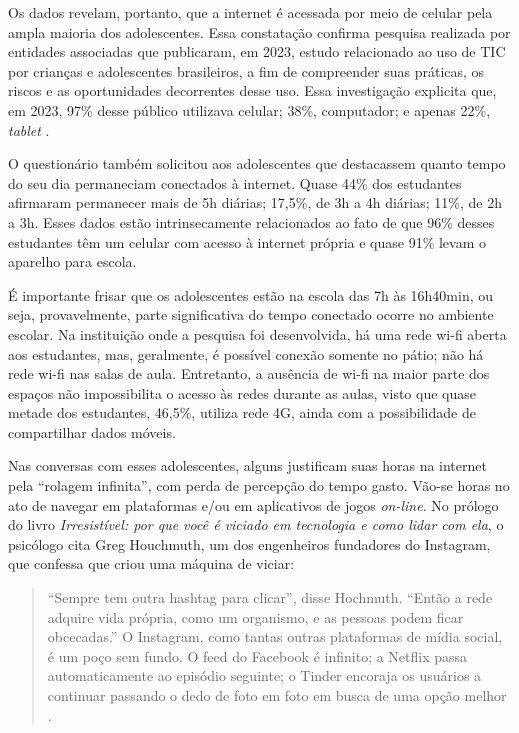 \documentclass[portuguese]{textolivre}
\begin{document}
Os dados revelam, portanto, que a internet é acessada por meio de celular pela ampla maioria dos adolescentes. Essa constatação confirma pesquisa realizada por entidades associadas que publicaram, em 2023, estudo relacionado ao uso de TIC por crianças e adolescentes brasileiros, a fim de compreender suas práticas, os riscos e as oportunidades decorrentes desse uso. Essa investigação explicita que, em 2023, 97\% desse público utilizava celular; 38\%, computador; e apenas 22\%, \textit{tablet} \cite{centro_regional_de_estudos_para_o_desenvolvimento_da_sociedade_da_informacao_tic_2023}.

O questionário também solicitou aos adolescentes que destacassem quanto tempo do seu dia permaneciam conectados à internet. Quase 44\% dos estudantes afirmaram permanecer mais de 5h diárias; 17,5\%, de 3h a 4h diárias; 11\%, de 2h a 3h. Esses dados estão intrinsecamente relacionados ao fato de que 96\% desses estudantes têm um celular com acesso à internet própria e quase 91\% levam o aparelho para escola.

É importante frisar que os adolescentes estão na escola das 7h às 16h40min, ou seja, provavelmente, parte significativa do tempo conectado ocorre no ambiente escolar. Na instituição onde a pesquisa foi desenvolvida, há uma rede wi-fi aberta aos estudantes, mas, geralmente, é possível conexão somente no pátio; não há rede wi-fi nas salas de aula. Entretanto, a ausência de wi-fi na maior parte dos espaços não impossibilita o acesso às redes durante as aulas, visto que quase metade dos estudantes, 46,5\%, utiliza rede 4G, ainda com a possibilidade de compartilhar dados móveis.

Nas conversas com esses adolescentes, alguns justificam suas horas na internet pela ``rolagem infinita'', com perda de percepção do tempo gasto. Vão-se horas no ato de navegar em plataformas e/ou em aplicativos de jogos \textit{on-line}. No prólogo do livro \textit{Irresistível: por que você é viciado em tecnologia e como lidar com ela}, o psicólogo \textcite{alter_irresistivel:_2018} cita Greg Houchmuth, um dos engenheiros fundadores do Instagram, que confessa que criou uma máquina de viciar:

\begin{quote}
    ``Sempre tem outra hashtag para clicar'', disse Hochmuth. ``Então a rede adquire vida própria, como um organismo, e as pessoas podem ficar obcecadas.'' O Instagram, como tantas outras plataformas de mídia social, é um poço sem fundo. O feed do Facebook é infinito; a Netflix passa automaticamente ao episódio seguinte; o Tinder encoraja os usuários a continuar passando o dedo de foto em foto em busca de uma opção melhor \cite[p.~10-11]{alter_irresistivel:_2018}.
\end{quote}
\end{document}
